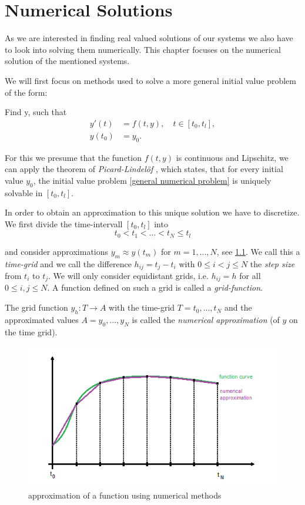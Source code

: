 \chapter{Numerical Solutions}
As we are interested in finding real valued solutions of our systems we also have to look into solving them numerically. This chapter focuses on the numerical solution of the mentioned systems.

We will first focus on methods used to solve a more general initial value problem of the form:

Find y, such that
\begin{align}
	\label{general numerical problem}
	y'(t) &= f(t,y), \quad t \in [t_0, t_l], \\
	y(t_0) &= y_0.
\end{align}

For this we presume that the function $f(t,y)$ is continuous and Lipschitz, we can apply the theorem of \emph{Picard-Lindelöf} , which states, that for every initial value $y_0$, the initial value problem \eqref{general numerical problem} is uniquely solvable in $[t_0, t_l]$.

In order to obtain an approximation to this unique solution we have to discretize. We first divide the time-intervall $[t_0, t_l]$ into
\begin{displaymath}
	t_0 < t_1 < ... < t_N \leq t_l
\end{displaymath}

and consider approximations $y_m \approx y(t_m)$ for $m=1,...,N$, see \ref{fig:numerical approximation}. We call this a \emph{time-grid} and we call the difference $h_{ij} = t_j - t_i$ with $0 \leq i < j \leq N$ the \emph{step size} from $t_i$ to $t_j$. We will only consider equidistant grids, i.e. $h_{ij} = h$ for all $0 \leq i,j \leq N$. A function defined on such a grid is called a \emph{grid-function}.

The grid function $y_h : T \to A$ with the time-grid $T={t_0, ..., t_N}$ and the approximated values $A = {y_0, ..., y_N}$ is called the \emph{numerical approximation} (of $y$ on the time grid).
\begin{figure}[H]
	\label{fig:numerical approximation}
	\centering
	\includegraphics[scale=0.7]{pictures/num_approx.png}
	\caption{approximation of a function using numerical methods}
\end{figure}

